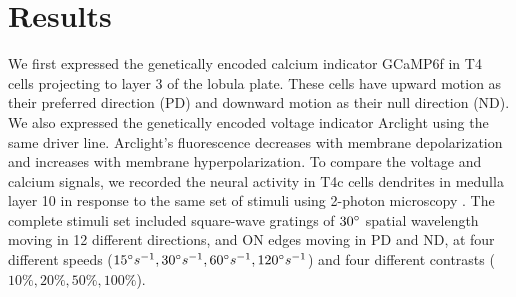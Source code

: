 \documentclass[9pt,lineno]{elife}
\begin{document}


\section{Results}

We first expressed the genetically encoded calcium indicator GCaMP6f \parencite{Chen2013} in T4 cells projecting to layer 3 of the lobula plate. These cells have upward motion as their preferred direction (PD) and downward motion as their null direction (ND). We also expressed the genetically encoded voltage indicator Arclight \parencite{Jin2012} using the same driver line. Arclight's fluorescence decreases with membrane depolarization and increases with membrane hyperpolarization. To compare the voltage and calcium signals,  we recorded the neural activity in T4c cells dendrites in medulla layer 10 in response to the same set of stimuli using 2-photon microscopy \parencite{Denk1990}. The complete stimuli set included square-wave gratings of $30\degree$ spatial wavelength moving in 12 different directions, and ON edges moving in PD and ND, at four different speeds ($15\degree s^{-1}, 30\degree s^{-1}, 60\degree s^{-1}, 120\degree s^{-1}$) and four different contrasts ($10\%, 20\%, 50\%, 100\%$).
\end{document}
